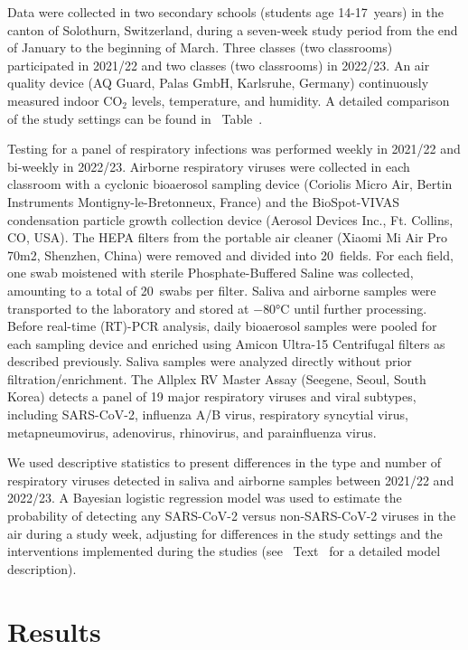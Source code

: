 \documentclass[fleqn,11pt]{wlscirep}
\begin{document}
Data were collected in two secondary schools (students age 14-17~years) in the canton of Solothurn, Switzerland, during a seven-week study period from the end of January to the beginning of March. Three classes (two classrooms) participated in 2021/22 and two classes (two classrooms) in 2022/23. An air quality device (AQ Guard, Palas GmbH, Karlsruhe, Germany) continuously measured indoor CO$_2$ levels, temperature, and humidity. A detailed comparison of the study settings can be found in \supp~Table~. 

Testing for a panel of respiratory infections was performed weekly in 2021/22 and bi-weekly in 2022/23. Airborne respiratory viruses were collected in each classroom with a cyclonic bioaerosol sampling device (Coriolis Micro Air, Bertin Instruments Montigny-le-Bretonneux, France) and the BioSpot-VIVAS condensation particle growth collection device (Aerosol Devices Inc., Ft. Collins, CO, USA)\cite{Lednicky2016AST}. The HEPA filters from the portable air cleaner (Xiaomi Mi Air Pro 70m2, Shenzhen, China) were removed and divided into 20~fields. For each field, one swab moistened with sterile Phosphate-Buffered Saline was collected, amounting to a total of 20~swabs per filter. Saliva and airborne samples were transported to the laboratory and stored at $-$80°C until further processing\cite{Huber2021}. Before real-time (RT)-PCR analysis, daily bioaerosol samples were pooled for each sampling device and enriched using Amicon Ultra-15 Centrifugal filters as described previously\cite{Banholzer2023PLoSMed}. Saliva samples were analyzed directly without prior filtration/enrichment. The Allplex RV Master Assay (Seegene, Seoul, South Korea) detects a panel of 19 major respiratory viruses and viral subtypes, including SARS-CoV-2, influenza A/B virus, respiratory syncytial virus, metapneumovirus, adenovirus, rhinovirus, and parainfluenza virus. 

We used descriptive statistics to present differences in the type and number of respiratory viruses detected in saliva and airborne samples between 2021/22 and 2022/23. A Bayesian logistic regression model was used to estimate the probability of detecting any SARS-CoV-2 versus non-SARS-CoV-2 viruses in the air during a study week, adjusting for differences in the study settings and the interventions implemented during the studies (see \supp~Text~ for a detailed model description).   

\section*{Results}
\end{document}
